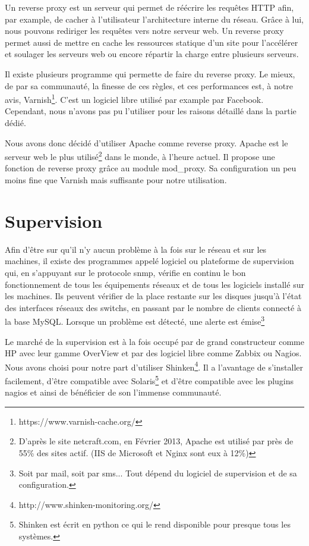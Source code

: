 \documentclass[a4paper,oneside]{report}
\begin{document}
Un reverse proxy est un serveur qui permet de réécrire les requêtes HTTP afin, par example, de cacher à l'utilisateur l'architecture interne du réseau.
Grâce à lui, nous pouvons rediriger les requêtes vers notre serveur web.
Un reverse proxy permet aussi de mettre en cache les ressources statique d'un site pour l'accélérer et soulager les serveurs web ou encore répartir la charge entre plusieurs serveurs.

Il existe plusieurs programme qui permette de faire du reverse proxy.
Le mieux, de par sa communauté, la finesse de ces règles, et ces performances est, à notre avis, Varnish\footnote{https://www.varnish-cache.org/}.
C'est un logiciel libre utilisé par example par Facebook. Cependant, nous n'avons pas pu l'utiliser pour les raisons détaillé dans la partie dédié.

Nous avons donc décidé d'utiliser Apache comme reverse proxy. Apache est le serveur web le plus utilisé\footnote{D'après le site netcraft.com, en Février 2013, Apache est utilisé par près de 55\% des sites actif. (IIS de Microsoft et Nginx sont eux à 12\%)} dans le monde, à l'heure actuel.
Il propose une fonction de reverse proxy grâce au module mod\_proxy. Sa configuration un peu moins fine que Varnish mais suffisante pour notre utilisation.

\section{Supervision}
Afin d'être sur qu'il n'y aucun problème à la fois sur le réseau et sur les machines, il existe des programmes appelé logiciel ou plateforme de supervision qui, en s'appuyant sur le protocole snmp, vérifie en continu le bon fonctionnement de tous les équipements réseaux et de tous les logiciels installé sur les machines.
Ils peuvent vérifier de la place restante sur les disques jusqu'à l'état des interfaces réseaux des switchs, en passant par le nombre de clients connecté à la base MySQL.
Lorsque un problème est détecté, une alerte est émise\footnote{Soit par mail, soit par sms... Tout dépend du logiciel de supervision et de sa configuration.}

Le marché de la supervision est à la fois occupé par de grand constructeur comme HP avec leur gamme OverView et par des logiciel libre comme Zabbix ou Nagios.
Nous avons choisi pour notre part d'utiliser Shinken\footnote{http://www.shinken-monitoring.org/}.
Il a l'avantage de s'installer facilement, d'être compatible avec Solaris\footnote{Shinken est écrit en python ce qui le rend disponible pour presque tous les systèmes.} et d'être compatible avec les plugins nagios et ainsi de bénéficier de son l'immense communauté.
\end{document}
